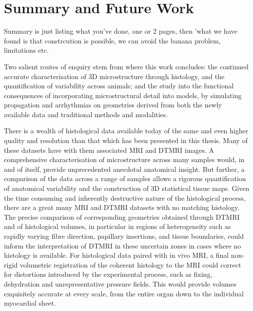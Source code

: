 \chapter{Summary and Future Work}
\dblspace

Summary is just listing what you've done, one or 2 pages, then 'what we have found is that constrcution is possible, we can avoid the banana problem, limitations etc.

  Two salient routes of enquiry stem from where this work concludes: the continued accurate characterisation of 3D microstructure through histology, and the quantification of variability across animals; and the study into the functional consequences of incorporating microstructural detail into models, by simulating propagation and arrhythmias on geometries derived from both the newly available data and traditional methods and modalities.
  
  There is a wealth of histological data available today of the same and even higher quality and resolution than that which has been presented in this thesis. Many of these datasets have with them associated MRI and DTMRI images. A comprehensive characterisation of microstructure across many samples would, in and of itself, provide unprecedented anecdotal anatomical insight. But further, a comparison of the data across a range of samples allows a rigorous quantification of anatomical variability and the construction of 3D statistical tissue maps. Given the time consuming and inherently destructive nature of the histological process, there are a great many MRI and DTMRI datasets with no matching histology. The precise comparison of corresponding geometries obtained through DTMRI and of histological volumes, in particular in regions of heterogeneity such as rapidly varying fibre direction, papillary insertions, and tissue boundaries, could inform the interpretation of DTMRI in these uncertain zones in cases where no histology is available. For histological data paired with in vivo MRI, a final non-rigid volumetric registration of the coherent histology to the MRI could correct for distortions introduced by the experimental process, such as fixing, dehydration and unrepresentative pressure fields. This would provide volumes exquisitely accurate at every scale, from the entire organ down to the individual myocardial sheet.
  
